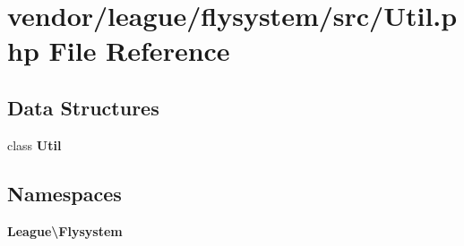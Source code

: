 \section{vendor/league/flysystem/src/\+Util.php File Reference}
\label{league_2flysystem_2src_2_util_8php}
\subsection*{Data Structures}
\begin{DoxyCompactItemize}
\item 
class {\bf Util}
\end{DoxyCompactItemize}
\subsection*{Namespaces}
\begin{DoxyCompactItemize}
\item 
 {\bf League\textbackslash{}\+Flysystem}
\end{DoxyCompactItemize}
